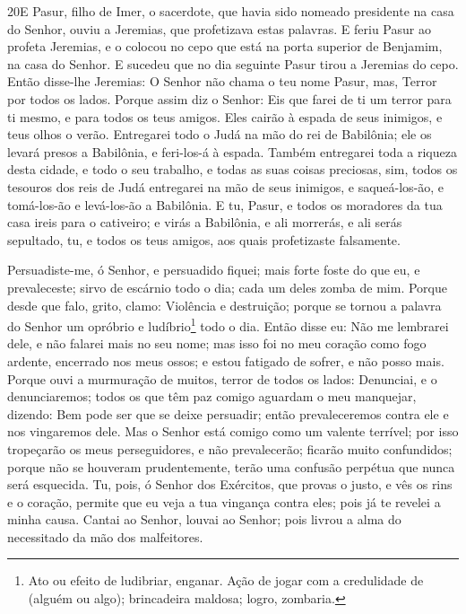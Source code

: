 \medskip

\lettrine{20} E Pasur, filho de Imer, o sacerdote, que havia
sido nomeado presidente na casa do Senhor, ouviu a Jeremias, que
profetizava estas palavras. E feriu Pasur ao profeta Jeremias, e
o colocou no cepo que está na porta superior de Benjamim, na casa do
Senhor. E sucedeu que no dia seguinte Pasur tirou a Jeremias do
cepo. Então disse-lhe Jeremias: O Senhor não chama o teu nome Pasur,
mas, Terror por todos os lados. Porque assim diz o Senhor: Eis
que farei de ti um terror para ti mesmo, e para todos os teus
amigos. Eles cairão à espada de seus inimigos, e teus olhos o verão.
Entregarei todo o Judá na mão do rei de Babilônia; ele os levará
presos a Babilônia, e feri-los-á à espada. Também entregarei
toda a riqueza desta cidade, e todo o seu trabalho, e todas as suas
coisas preciosas, sim, todos os tesouros dos reis de Judá entregarei
na mão de seus inimigos, e saqueá-los-ão, e tomá-los-ão e
levá-los-ão a Babilônia. E tu, Pasur, e todos os moradores da
tua casa ireis para o cativeiro; e virás a Babilônia, e ali
morrerás, e ali serás sepultado, tu, e todos os teus amigos, aos
quais profetizaste falsamente.

Persuadiste-me, ó Senhor, e persuadido fiquei; mais forte foste do
que eu, e prevaleceste; sirvo de escárnio todo o dia; cada um deles
zomba de mim. Porque desde que falo, grito, clamo: Violência e
destruição; porque se tornou a palavra do Senhor um opróbrio e
ludíbrio\footnote{Ato ou efeito de ludibriar, enganar. Ação de jogar
com a credulidade de (alguém ou algo); brincadeira maldosa; logro,
zombaria.} todo o dia. Então disse eu: Não me lembrarei dele, e
não falarei mais no seu nome; mas isso foi no meu coração como fogo
ardente, encerrado nos meus ossos; e estou fatigado de sofrer, e não
posso mais. Porque ouvi a murmuração de muitos, terror de
todos os lados: Denunciai, e o denunciaremos; todos os que têm paz
comigo aguardam o meu manquejar, dizendo: Bem pode ser que se deixe
persuadir; então prevaleceremos contra ele e nos vingaremos dele.
Mas o Senhor está comigo como um valente terrível; por isso
tropeçarão os meus perseguidores, e não prevalecerão; ficarão muito
confundidos; porque não se houveram prudentemente, terão uma
confusão perpétua que nunca será esquecida. Tu, pois, ó
Senhor dos Exércitos, que provas o justo, e vês os rins e o coração,
permite que eu veja a tua vingança contra eles; pois já te revelei a
minha causa. Cantai ao Senhor, louvai ao Senhor; pois livrou
a alma do necessitado da mão dos malfeitores.

